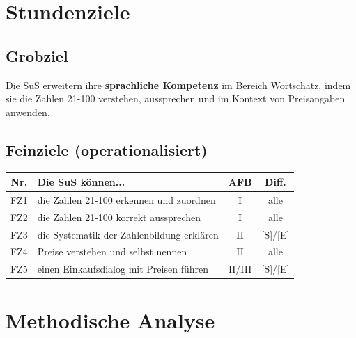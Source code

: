 \documentclass[11pt,a4paper]{article}
\begin{document}
\section{Stundenziele}

\subsection{Grobziel}
Die SuS erweitern ihre \textbf{sprachliche Kompetenz} im Bereich Wortschatz, indem sie die Zahlen 21-100 verstehen, aussprechen und im Kontext von Preisangaben anwenden.

\subsection{Feinziele (operationalisiert)}
\begin{tabular}{|c|p{8cm}|c|c|}
\hline
\textbf{Nr.} & \textbf{Die SuS können...} & \textbf{AFB} & \textbf{Diff.} \\
\hline
FZ1 & die Zahlen 21-100 erkennen und zuordnen & I & alle \\
\hline
FZ2 & die Zahlen 21-100 korrekt aussprechen & I & alle \\
\hline
FZ3 & die Systematik der Zahlenbildung erklären & II & [S]/[E] \\
\hline
FZ4 & Preise verstehen und selbst nennen & II & alle \\
\hline
FZ5 & einen Einkaufsdialog mit Preisen führen & II/III & [S]/[E] \\
\hline
\end{tabular}

\section{Methodische Analyse}
\end{document}
